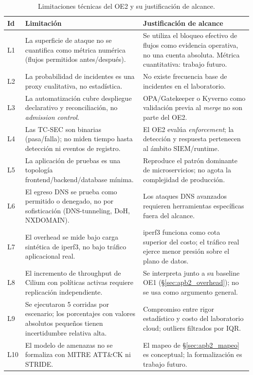 \begin{table}[htbp]
\centering
\scriptsize
\caption{Limitaciones técnicas del OE2 y su justificación de alcance.}
\label{tab:apb2_limitaciones}
\begin{tabularx}{\textwidth}{|l|Y|Y|}
\hline
\textbf{Id} & \textbf{Limitación} & \textbf{Justificación de alcance} \\
\hline
L1 & La superficie de ataque no se cuantifica como métrica numérica (flujos permitidos antes/después). & Se utiliza el bloqueo efectivo de flujos como evidencia operativa, no una cuenta absoluta. Métrica cuantitativa: trabajo futuro. \\
\hline
L2 & La probabilidad de incidentes es una proxy cualitativa, no estadística. & No existe frecuencia base de incidentes en el laboratorio. \\
\hline
L3 & La automatización cubre despliegue declarativo y reconciliación, no \emph{admission control}. & OPA/Gatekeeper o Kyverno como validación previa al \emph{merge} no son parte del OE2. \\
\hline
L4 & Las TC-SEC son binarias (pasa/falla); no miden tiempo hasta detección ni eventos de registro. & El OE2 evalúa \emph{enforcement}; la detección y respuesta pertenecen al ámbito SIEM/runtime. \\
\hline
L5 & La aplicación de pruebas es una topología frontend/backend/database mínima. & Reproduce el patrón dominante de microservicios; no agota la complejidad de producción. \\
\hline
L6 & El egreso DNS se prueba como permitido o denegado, no por sofisticación (DNS-tunneling, DoH, NXDOMAIN). & Los ataques DNS avanzados requieren herramientas específicas fuera del alcance. \\
\hline
L7 & El overhead se mide bajo carga sintética de iperf3, no bajo tráfico aplicacional real. & iperf3 funciona como cota superior del costo; el tráfico real ejerce menor presión sobre el plano de datos. \\
\hline
L8 & El incremento de throughput de Cilium con políticas activas requiere replicación independiente. & Se interpreta junto a su baseline OE1 (\S\ref{sec:apb2_overhead}); no se usa como argumento general. \\
\hline
L9 & Se ejecutaron 5 corridas por escenario; los porcentajes con valores absolutos pequeños tienen incertidumbre relativa alta. & Compromiso entre rigor estadístico y costo del laboratorio cloud; outliers filtrados por IQR. \\
\hline
L10 & El modelo de amenazas no se formaliza con MITRE ATT\&CK ni STRIDE. & El mapeo de \S\ref{sec:apb2_mapeo} es conceptual; la formalización es trabajo futuro. \\
\hline
\end{tabularx}
\end{table}
\fi


